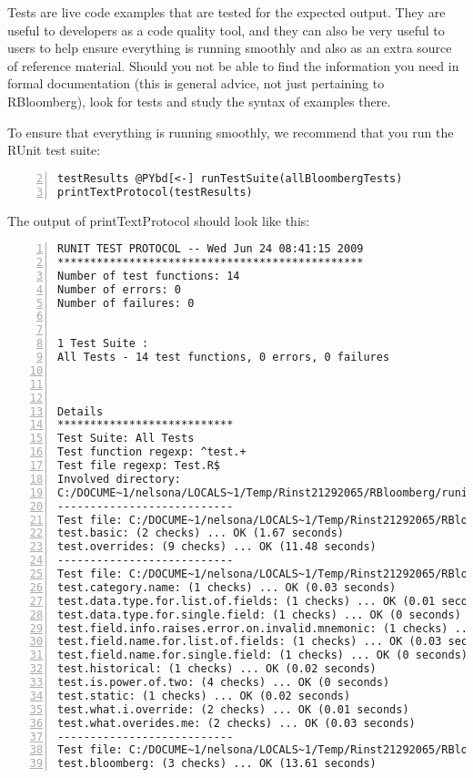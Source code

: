 \documentclass[a4paper]{article}
\begin{document}
Tests are live code examples that are tested for the expected output. They are useful to developers as a code quality tool, and they can also be very useful to users to help ensure everything is running smoothly and also as an extra source of reference material. Should you not be able to find the information you need in formal documentation (this is general advice, not just pertaining to RBloomberg), look for tests and study the syntax of examples there.

To ensure that everything is running smoothly, we recommend that you run the RUnit test suite:

\begin{Verbatim}[commandchars=@\[\],numbers=left,firstnumber=2,stepnumber=1]
testResults @PYbd[<-] runTestSuite(allBloombergTests)
printTextProtocol(testResults)
\end{Verbatim}

    

The output of printTextProtocol should look like this:

\begin{Verbatim}[commandchars=@\[\],numbers=left,firstnumber=1,stepnumber=1]
RUNIT TEST PROTOCOL -- Wed Jun 24 08:41:15 2009 
*********************************************** 
Number of test functions: 14 
Number of errors: 0 
Number of failures: 0 

 
1 Test Suite : 
All Tests - 14 test functions, 0 errors, 0 failures



Details 
*************************** 
Test Suite: All Tests 
Test function regexp: ^test.+ 
Test file regexp: Test.R$ 
Involved directory: 
C:/DOCUME~1/nelsona/LOCALS~1/Temp/Rinst21292065/RBloomberg/runit-tests 
--------------------------- 
Test file: C:/DOCUME~1/nelsona/LOCALS~1/Temp/Rinst21292065/RBloomberg/runit-tests/blpGetDataTest.R 
test.basic: (2 checks) ... OK (1.67 seconds)
test.overrides: (9 checks) ... OK (11.48 seconds)
--------------------------- 
Test file: C:/DOCUME~1/nelsona/LOCALS~1/Temp/Rinst21292065/RBloomberg/runit-tests/blpToolsTest.R 
test.category.name: (1 checks) ... OK (0.03 seconds)
test.data.type.for.list.of.fields: (1 checks) ... OK (0.01 seconds)
test.data.type.for.single.field: (1 checks) ... OK (0 seconds)
test.field.info.raises.error.on.invalid.mnemonic: (1 checks) ... OK (0 seconds)
test.field.name.for.list.of.fields: (1 checks) ... OK (0.03 seconds)
test.field.name.for.single.field: (1 checks) ... OK (0 seconds)
test.historical: (1 checks) ... OK (0.02 seconds)
test.is.power.of.two: (4 checks) ... OK (0 seconds)
test.static: (1 checks) ... OK (0.02 seconds)
test.what.i.override: (2 checks) ... OK (0.01 seconds)
test.what.overides.me: (2 checks) ... OK (0.03 seconds)
--------------------------- 
Test file: C:/DOCUME~1/nelsona/LOCALS~1/Temp/Rinst21292065/RBloomberg/runit-tests/rcomBloombergTest.R 
test.bloomberg: (3 checks) ... OK (13.61 seconds)
\end{Verbatim}
\end{document}
